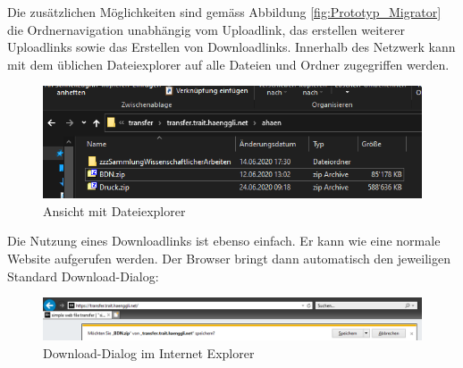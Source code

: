 Die zusätzlichen Möglichkeiten sind gemäss Abbildung \ref{fig:Prototyp_Migrator} 
die Ordnernavigation unabhängig vom Uploadlink, das erstellen weiterer Uploadlinks 
sowie das Erstellen von Downloadlinks.
Innerhalb des Netzwerk kann mit dem üblichen Dateiexplorer auf alle Dateien und Ordner zugegriffen werden.
\begin{figure}[!h]
    \centering
    \includegraphics[width=1\linewidth]{content/images/file_explorer.png}
    \caption{Ansicht mit Dateiexplorer}
    \label{fig:file_explorer}
\end{figure}

\clearpage

Die Nutzung eines Downloadlinks ist ebenso einfach. Er kann wie eine normale Website aufgerufen werden.
Der Browser bringt dann automatisch den jeweiligen Standard Download-Dialog:
\begin{figure}[!h]
    \centering
    \includegraphics[width=1\linewidth]{content/images/prototyp_download.png}
    \caption{Download-Dialog im Internet Explorer}
    \label{fig:ie_download}
\end{figure}

